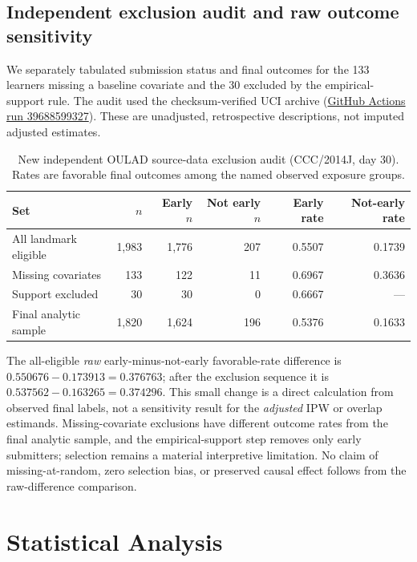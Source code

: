\documentclass[10pt,a4paper]{article}
\begin{document}
\subsection{Independent exclusion audit and raw outcome sensitivity}
We separately tabulated submission status and final outcomes for the 133 learners missing a baseline covariate and the 30 excluded by the empirical-support rule. The audit used the checksum-verified UCI archive (\href{https://github.com/devissaputra/causal_learning_analytics/actions/runs/39688599327}{GitHub Actions run 39688599327}). These are unadjusted, retrospective descriptions, not imputed adjusted estimates.
\begin{table}[ht]\centering\small
\caption{New independent OULAD source-data exclusion audit (CCC/2014J, day 30). Rates are favorable final outcomes among the named observed exposure groups.}
\label{tab:exclusions}
\begin{tabular}{lrrrrr}\toprule
Set & $n$ & Early $n$ & Not early $n$ & Early rate & Not-early rate\\\midrule
All landmark eligible & 1,983 & 1,776 & 207 & 0.5507 & 0.1739\\
Missing covariates & 133 & 122 & 11 & 0.6967 & 0.3636\\
Support excluded & 30 & 30 & 0 & 0.6667 & ---\\
Final analytic sample & 1,820 & 1,624 & 196 & 0.5376 & 0.1633\\\bottomrule
\end{tabular}\end{table}
The all-eligible \emph{raw} early-minus-not-early favorable-rate difference is $0.550676-0.173913=0.376763$; after the exclusion sequence it is $0.537562-0.163265=0.374296$. This small change is a direct calculation from observed final labels, not a sensitivity result for the \emph{adjusted} IPW or overlap estimands. Missing-covariate exclusions have different outcome rates from the final analytic sample, and the empirical-support step removes only early submitters; selection remains a material interpretive limitation. No claim of missing-at-random, zero selection bias, or preserved causal effect follows from the raw-difference comparison.

\section{Statistical Analysis}
\end{document}
